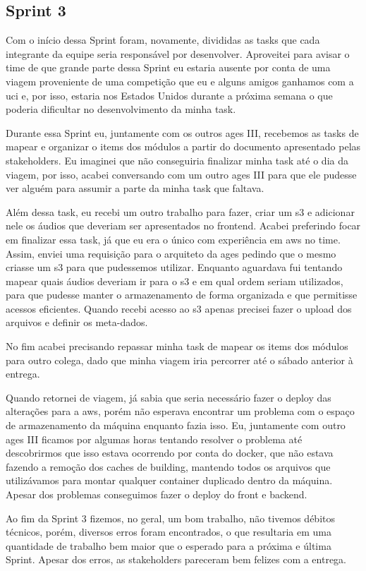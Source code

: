 \subsection{Sprint 3}
Com o início dessa Sprint foram, novamente, divididas as tasks que cada integrante da equipe seria responsável por desenvolver. Aproveitei para avisar o time de que grande parte dessa Sprint eu estaria ausente por conta de uma viagem proveniente de uma competição que eu e alguns amigos ganhamos com a \ac{uci} e, por isso, estaria nos Estados Unidos durante a próxima semana o que poderia dificultar no desenvolvimento da minha task.

Durante essa Sprint eu, juntamente com os outros \ac{ages} III, recebemos as tasks de mapear e organizar o items dos módulos a partir do documento apresentado pelas stakeholders. Eu imaginei que não conseguiria finalizar minha task até o dia da viagem, por isso, acabei conversando com um outro \ac{ages} III para que ele pudesse ver alguém para assumir a parte da minha task que faltava.

Além dessa task, eu recebi um outro trabalho para fazer, criar um \ac{s3} e adicionar nele os áudios que deveriam ser apresentados no frontend. Acabei preferindo focar em finalizar essa task, já que eu era o único com experiência em \ac{aws} no time. Assim, enviei uma requisição para o arquiteto da \ac{ages} pedindo que o mesmo criasse um \ac{s3} para que pudessemos utilizar. Enquanto aguardava fui tentando mapear quais áudios deveriam ir para o \ac{s3} e em qual ordem seriam utilizados, para que pudesse manter o armazenamento de forma organizada e que permitisse acessos eficientes. Quando recebi acesso ao \ac{s3} apenas precisei fazer o upload dos arquivos e definir os meta-dados.

No fim acabei precisando repassar minha task de mapear os items dos módulos para outro colega, dado que minha viagem iria percorrer até o sábado anterior à entrega.

Quando retornei de viagem, já sabia que seria necessário fazer o deploy das alterações para a \ac{aws}, porém não esperava encontrar um problema com o espaço de armazenamento da máquina enquanto fazia isso. Eu, juntamente com outro \ac{ages} III ficamos por algumas horas tentando resolver o problema até descobrirmos que isso estava ocorrendo por conta do docker, que não estava fazendo a remoção dos caches de building, mantendo todos os arquivos que utilizávamos para montar qualquer container duplicado dentro da máquina. Apesar dos problemas conseguimos fazer o deploy do front e backend.

Ao fim da Sprint 3 fizemos, no geral, um bom trabalho, não tivemos débitos técnicos, porém, diversos erros foram encontrados, o que resultaria em uma quantidade de trabalho bem maior que o esperado para a próxima e última Sprint. Apesar dos erros, as stakeholders pareceram bem felizes com a entrega.